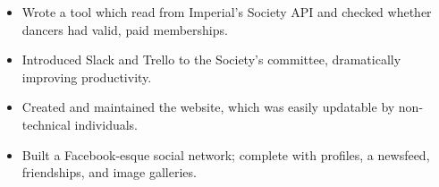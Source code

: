 \documentclass{jcgcv}
\begin{document}
\begin{column}
\begin{itemize}
  \item Wrote a tool which read from Imperial's Society API and checked
        whether dancers had valid, paid memberships.
  \item Introduced Slack and Trello to the Society's committee, dramatically 
        improving productivity.
  \item Created and maintained the website, which was easily updatable by
        non-technical individuals.
\end{itemize}

\begin{itemize}
  \item Built a Facebook-esque social network; complete with profiles, a
        newsfeed, friendships, and image galleries.
\end{itemize}



\end{column}%
\end{document}
